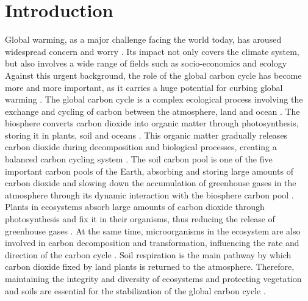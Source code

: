 \documentclass[12pt]{article}
\begin{document}
\newpage
\section{Introduction}

Global warming, as a major challenge facing the world today, has aroused widespread concern and worry \citep{helbling2023global}. Its impact not only covers the climate system, but also involves a wide range of fields such as socio-economics and ecology \citep{sodangi2011climate,grace2004understanding,falkowski2000global,wani2023multi} Against this urgent background, the role of the global carbon cycle has become more and more important, as it carries a huge potential for curbing global warming \citep{falkowski2000global}. The global carbon cycle is a complex ecological process involving the exchange and cycling of carbon between the atmosphere, land and ocean \citep{grace2004understanding,falkowski2000global}. The biosphere converts carbon dioxide into organic matter through photosynthesis, storing it in plants, soil and oceans \citep{wani2023multi}. This organic matter gradually releases carbon dioxide during decomposition and biological processes, creating a balanced carbon cycling system \citep{wani2023multi}.     The soil carbon pool is one of the five important carbon pools of the Earth, absorbing and storing large amounts of carbon dioxide and slowing down the accumulation of greenhouse gases in the atmosphere through its dynamic interaction with the biosphere carbon pool \citep{wani2023multi}. Plants in ecosystems absorb large amounts of carbon dioxide through photosynthesis and fix it in their organisms, thus reducing the release of greenhouse gases \citep{falkowski2000global}. At the same time, microorganisms in the ecosystem are also involved in carbon decomposition and transformation, influencing the rate and direction of the carbon cycle \citep{hawkins2023mycorrhizal,de2020microbial}. Soil respiration is the main pathway by which carbon dioxide fixed by land plants is returned to the atmosphere\citep{schlesinger2000soil}. Therefore, maintaining the integrity and diversity of ecosystems and protecting vegetation and soils are essential for the stabilization of the global carbon cycle \citep{wani2023multi}.\\\\
\end{document}
